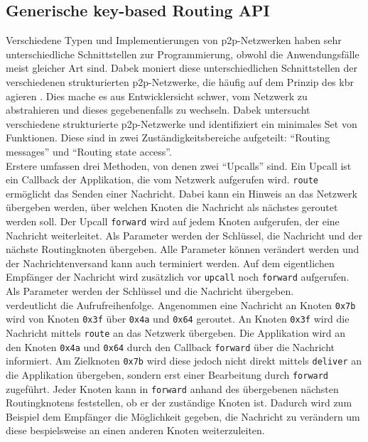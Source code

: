 \subsection{Generische key-based Routing API}
\label{chap:grundlagen:api}
Verschiedene Typen und Implementierungen von p2p-Netzwerken haben sehr unterschiedliche Schnittstellen zur Programmierung, obwohl die Anwendungsfälle meist gleicher Art sind. Dabek moniert diese unterschiedlichen Schnittstellen der verschiedenen strukturierten p2p-Netzwerke, die häufig auf dem Prinzip des \ac{kbr} agieren \cite{Dabek2003Towards}. Dies mache es aus Entwicklersicht schwer, vom Netzwerk zu abstrahieren und dieses gegebenenfalls zu wechseln. Dabek untersucht verschiedene strukturierte p2p-Netzwerke und identifiziert ein minimales Set von Funktionen. Diese sind in zwei Zuständigkeitsbereiche aufgeteilt: \enquote{Routing messages} und \enquote{Routing state access}.\\
Erstere umfassen drei Methoden, von denen zwei \enquote{Upcalls} sind. Ein Upcall ist ein Callback der Applikation, die vom Netzwerk aufgerufen wird. \texttt{route} ermöglicht das Senden einer Nachricht. Dabei kann ein Hinweis an das Netzwerk übergeben werden, über welchen Knoten die Nachricht als nächstes geroutet werden soll. Der Upcall \texttt{forward} wird auf jedem Knoten aufgerufen, der eine Nachricht weiterleitet. Als Parameter werden der Schlüssel, die Nachricht und der nächste Routingknoten übergeben. Alle Parameter können verändert werden und der Nachrichtenversand kann auch terminiert werden. Auf dem eigentlichen Empfänger der Nachricht wird zusätzlich vor \texttt{upcall} noch \texttt{forward} aufgerufen. Als Parameter werden der Schlüssel und die Nachricht übergeben.\\
 verdeutlicht die Aufrufreihenfolge. Angenommen eine Nachricht an Knoten \texttt{0x7b} wird von Knoten \texttt{0x3f} über \texttt{0x4a} und \texttt{0x64} geroutet. An Knoten \texttt{0x3f} wird die Nachricht mittels \texttt{route} an das Netzwerk übergeben. Die Applikation wird an den Knoten \texttt{0x4a} und \texttt{0x64} durch den Callback \texttt{forward} über die Nachricht informiert. Am Zielknoten \texttt{0x7b} wird diese jedoch nicht direkt mittels \texttt{deliver} an die Applikation übergeben, sondern erst einer Bearbeitung durch \texttt{forward} zugeführt. Jeder Knoten kann in \texttt{forward} anhand des übergebenen nächsten Routingknotens feststellen, ob er der zuständige Knoten ist. Dadurch wird zum Beispiel dem Empfänger die Möglichkeit gegeben, die Nachricht zu verändern um diese bespielsweise an einen anderen Knoten weiterzuleiten.

